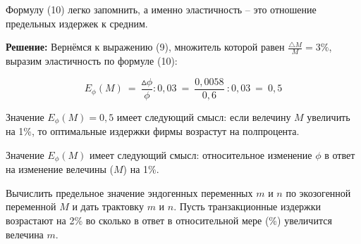\documentclass[12pt,a4paper]{article}
\begin{document}
Формулу (10) легко запомнить, а именно эластичность -- это отношение предельных издержек к средним.

\textbf{Решение:} Вернёмся к выражению (9), множитель которой равен $\displaystyle{\frac{\triangle M}{M} = 3\%}$, выразим эластичность по формуле (10):

\begin{equation*}
E_{\phi }( M) \ =\ \frac{\vartriangle \phi }{\phi } :0,03\ =\ \frac{0,0058}{0,6} \ :0,03\ =\ 0,5
\end{equation*}

Значение $E_{\phi}(M) = 0,5$ имеет следующий смысл: если велечину $M$ увеличить на 1\%, то оптимальные издержки фирмы возрастут на полпроцента.

Значение $E_{\phi}(M)$ имеет следующий смысл: относительное изменение $\phi$ в ответ на изменение велечины ($M$) на 1\%.


 Вычислить предельное значение эндогенных переменных $m$ и $n$ по экозогенной переменной $M$ и дать трактовку $m$ и $n$. Пусть транзакционные издержки возрастают на 2\% во сколько в ответ в относительной мере (\%) увеличится велечина $m$.
\end{document}
